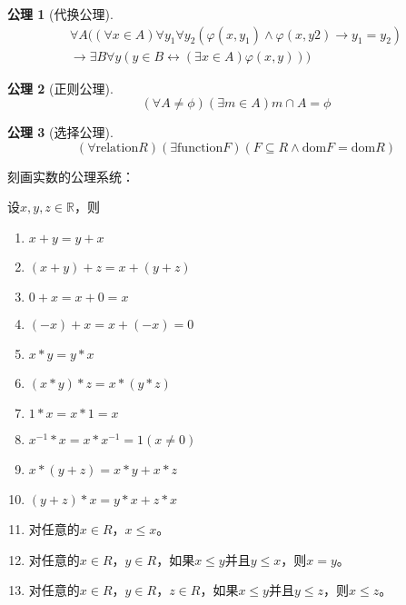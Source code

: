 \documentclass{book}[oneside]
\newtheorem{Ax}{公理}[chapter]
\begin{document}
\begin{CJK*}{UTF8}{gbsn}
\begin{Ax}[代换公理]
\begin{equation*}
\begin{split}
      \forall A ((\forall x \in A) \forall y_1 \forall y_2 (\varphi(x, y_1) \land \varphi(x, y2) \rightarrow y_1 = y_2)\\
      \rightarrow \exists B \forall y (y \in B \leftrightarrow (\exists x \in A) \varphi(x, y)))
    \end{split}
  \end{equation*}
  \end{Ax}
  \begin{Ax}[正则公理]
    \begin{equation*}
      (\forall A \neq \phi) (\exists m \in A) m \cap A = \phi
    \end{equation*}
  \end{Ax}
  \begin{Ax}[选择公理]
    \begin{equation*}
      (\forall \text{relation} R)
      (\exists \text{function} F)
      (F \subseteq R \land
      \text{dom} F
      = \text{dom} R)
    \end{equation*}
  \end{Ax}


  刻画实数的公理系统：

    设$x, y, z \in \mathbb{R}$，则
   \begin{enumerate}
   \item   $x + y = y + x$
   \item   $(x + y) + z = x + (y + z)$
   \item   $0 + x = x + 0 = x$
   \item   $(-x) + x =x + (-x) = 0$
   \item   $x * y = y * x$
   \item   $(x * y) * z = x * (y *z)$
   \item   $1 * x = x * 1 = x$
   \item   $x^{-1} * x = x * x^{-1} = 1 (x \neq 0)$
   \item   $x* (y + z) = x * y + x * z$
   \item   $(y + z) * x = y * x + z * x$
   \item 对任意的$x\in R$，$x\leq x$。
   \item 对任意的$x\in R$，$y\in R$，如果$x\leq y$并且$y\leq x$，则$x=y$。 
  \item 对任意的$x\in R$，$y\in R$，$z\in R$，如果$x\leq y$并且$y\leq z$，则$x\leq z$。
  

\end{enumerate}
\end{CJK*}
\end{document}
